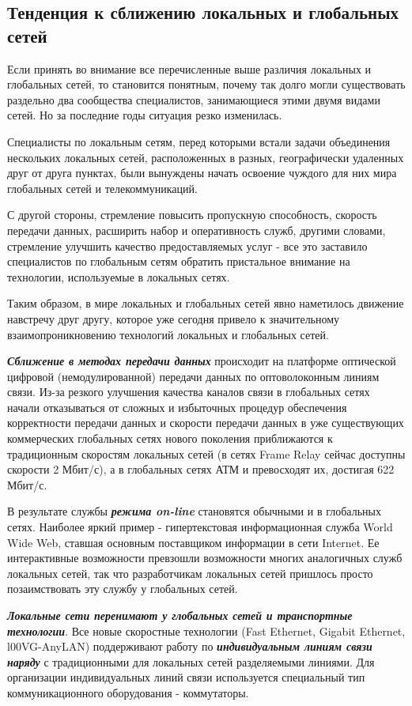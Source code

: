 \subsection{Тенденция к сближению локальных и глобальных сетей}

Если принять во внимание все перечисленные выше различия локальных и глобальных сетей, то становится понятным, почему так долго могли существовать раздельно два сообщества специалистов, занимающиеся этими двумя видами сетей.
Но за последние годы ситуация резко изменилась.

Специалисты по локальным сетям, перед которыми встали задачи объединения нескольких локальных сетей, расположенных в разных, географически удаленных друг от друга пунктах, были вынуждены начать освоение чуждого для них мира глобальных сетей и телекоммуникаций.

С другой стороны, стремление повысить пропускную способность, скорость передачи данных, расширить набор и оперативность служб, другими словами, стремление улучшить качество предоставляемых услуг - все это заставило специалистов по глобальным сетям обратить пристальное внимание на технологии, используемые в локальных сетях.

Таким образом, в мире локальных и глобальных сетей явно наметилось движение навстречу друг другу, которое уже сегодня привело к значительному взаимопроникновению технологий локальных и глобальных сетей.

\textbf{\textit{Сближение в методах передачи данных}} происходит на платформе оптической цифровой (немодулированной) передачи данных по оптоволоконным линиям связи.
Из-за резкого улучшения качества каналов связи в глобальных сетях начали отказываться от сложных и избыточных процедур обеспечения корректности передачи данных и скорости передачи данных в уже существующих коммерческих глобальных сетях нового поколения приближаются к традиционным скоростям локальных сетей (в сетях Frame Relay сейчас доступны скорости 2 Мбит/с), а в глобальных сетях АТМ и превосходят их, достигая 622 Мбит/с.

В результате службы \textbf{\textit{режима on-line}} становятся обычными и в глобальных сетях.
Наиболее яркий пример - гипертекстовая информационная служба World Wide Web, ставшая основным поставщиком информации в сети Internet.
Ее интерактивные возможности превзошли возможности многих аналогичных служб локальных сетей, так что разработчикам локальных сетей пришлось просто позаимствовать эту службу у глобальных сетей.

\textbf{\textit{Локальные сети перенимают у глобальных сетей и транспортные технологии}}.
Все новые скоростные технологии (Fast Ethernet, Gigabit Ethernet, l00VG-AnyLAN) поддерживают работу по \textbf{\textit{индивидуальным линиям связи наряду}} с традиционными для локальных сетей разделяемыми линиями.
Для организации индивидуальных линий связи используется специальный тип коммуникационного оборудования - коммутаторы.

